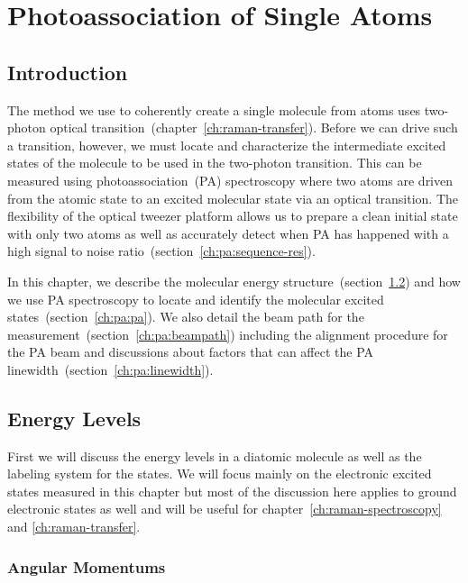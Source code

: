 
\chapter{Photoassociation of Single Atoms}
\label{ch:pa}

\section{Introduction}

The method we use to coherently create a single molecule from atoms
uses two-photon optical transition~(chapter~\ref{ch:raman-transfer}).
Before we can drive such a transition, however, we must locate and characterize
the intermediate excited states of the molecule to be used in the two-photon transition.
This can be measured using photoassociation~(PA) spectroscopy
where two atoms are driven from the atomic state to an excited molecular state
via an optical transition.
The flexibility of the optical tweezer platform allows us to
prepare a clean initial state with only two atoms
as well as accurately detect when PA has happened
with a high signal to noise ratio~(section~\ref{ch:pa:sequence-res}).

In this chapter, we describe the molecular energy structure~(section~\ref{ch:pa:structure})
and how we use PA spectroscopy to locate and
identify the molecular excited states~(section~\ref{ch:pa:pa}).
We also detail the beam path for the measurement~(section~\ref{ch:pa:beampath}) including
the alignment procedure for the PA beam and discussions about factors that can affect
the PA linewidth~(section~\ref{ch:pa:linewidth}).

\section{Energy Levels}
\label{ch:pa:structure}

First we will discuss the energy levels in a diatomic molecule
as well as the labeling system for the states.
We will focus mainly on the electronic excited states measured in this chapter
but most of the discussion here applies to ground electronic states as well
and will be useful for chapter~\ref{ch:raman-spectroscopy} and \ref{ch:raman-transfer}.

\subsection{Angular Momentums}

